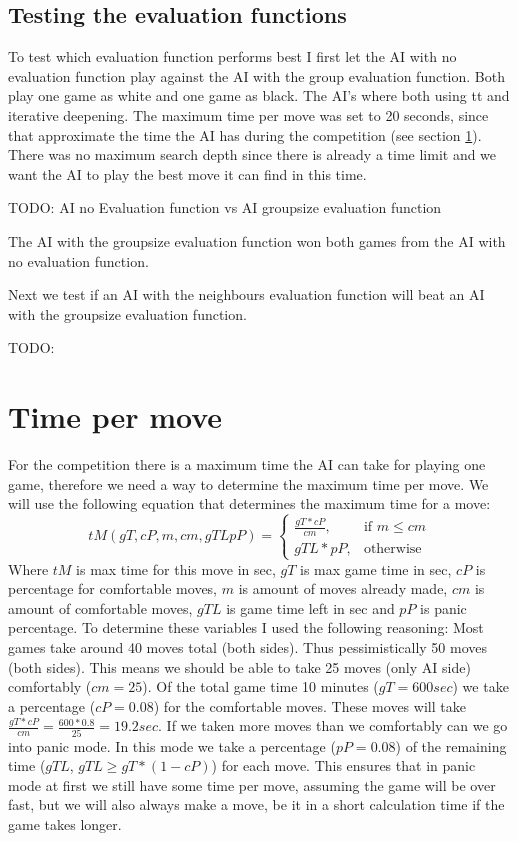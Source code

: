 \documentclass{article}
\begin{document}
\subsection{Testing the evaluation functions}
To test which evaluation function performs best I first let the AI with no evaluation function play against the AI with the group evaluation function. Both play one game as white and one game as black. The AI's where both using tt and iterative deepening. The maximum time per move was set to 20 seconds, since that approximate the time the AI has during the competition (see section \ref{sec:tpm}). There was no maximum search depth since there is already a time limit and we want the AI to play the best move it can find in this time.

TODO: AI no Evaluation function vs AI groupsize evaluation function

The AI with the groupsize evaluation function won both games from the AI with no evaluation function. 

Next we test if an AI with the neighbours evaluation function will beat an AI with the groupsize evaluation function.

TODO: 


\section{Time per move}
\label{sec:tpm}
For the competition there is a maximum time the AI can take for playing one game, therefore we need a way to determine the maximum time per move. We will use the following equation that determines the maximum time for a move:
\begin{equation*}
    tM(gT, cP, m, cm, gTL pP)= 
\begin{cases}
    \frac{gT*cP}{cm},& \text{if } m\leq cm\\
    gTL*pP,            & \text{otherwise}
\end{cases}
\end{equation*}
Where $tM$ is max time for this move in sec, $gT$ is max game time in sec, $cP$ is percentage for comfortable moves, $m$ is amount of moves already made, $cm$ is amount of comfortable moves, $gTL$ is game time left in sec and $pP$ is panic percentage.
To determine these variables I used the following reasoning:
Most games take around 40 moves total (both sides). Thus pessimistically 50 moves (both sides). This means we should be able to take 25 moves (only AI side) comfortably ($cm = 25$). Of the total game time  10 minutes ($gT = 600 sec$) we take a percentage ($cP = 0.08$) for the comfortable moves. These moves will take $\frac{gT*cP}{cm} = \frac{600*0.8}{25} = 19.2 sec$. If we taken more moves than we comfortably can we go into panic mode. In this mode we take a percentage ($pP = 0.08$) of the remaining time ($gTL$, $gTL \geq gT*(1-cP)$) for each move. This ensures that in panic mode at first we still have some time per move, assuming the game will be over fast, but we will also always make a move, be it in a short calculation time if the game takes longer.  
\end{document}
